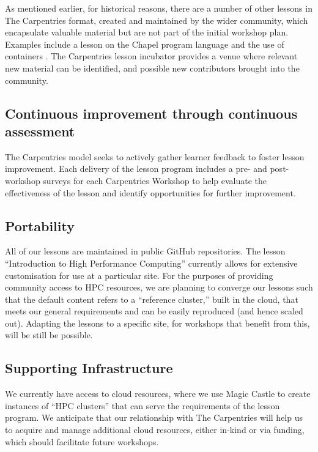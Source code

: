 As mentioned earlier, for historical reasons, there are a number of other lessons in The Carpentries format, created and maintained by the wider community, which encapsulate valuable material but are not part of the initial workshop plan. Examples include a lesson on the Chapel program language \cite{hpcchapel} and the use of containers \cite{hpccontainers}. The Carpentries lesson incubator provides a venue where relevant new material can be identified, and possible new contributors brought into the community.


\subsection{Continuous improvement through continuous assessment}

The Carpentries model seeks to actively gather learner feedback to foster lesson improvement. Each delivery of the lesson program includes a pre- and post- workshop surveys for each Carpentries Workshop to help evaluate the effectiveness of the lesson and identify opportunities for further improvement.

\subsection{Portability}

All of our lessons are maintained in public GitHub repositories. The lesson ``Introduction to High Performance Computing'' currently allows for extensive customisation for use at a particular site. For the purposes of providing community access to HPC resources, we are planning to converge our lessons such that the default content refers to a ``reference cluster,'' built in the cloud, that meets our general requirements and can be easily reproduced (and hence scaled out). Adapting the lessons to a specific site, for workshops that benefit from this, will be still be possible.

\subsection{Supporting Infrastructure}

We currently have access to cloud resources, where we use Magic Castle \cite{felix_antoine_fortin_2023_8096727} to create instances of ``HPC clusters'' that can serve the requirements of the lesson program. We anticipate that our relationship with The Carpentries will help us to acquire and manage additional cloud resources, either in-kind or via funding, which should facilitate future workshops.

